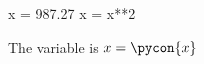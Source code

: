 \documentclass[11pt]{article}%
\begin{document}
 
\begin{pyconsole} 
x = 987.27 
x = x**2 
\end{pyconsole} 
 
The variable is $x=\pycon{x}$ 
\end{document}
